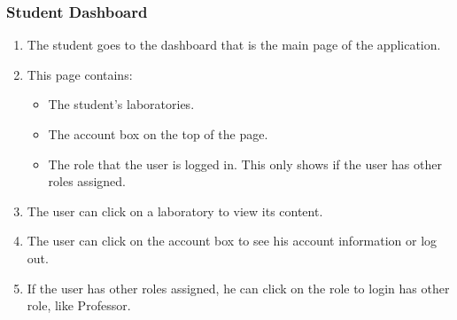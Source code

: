 \subsubsection{Student Dashboard}

\begin{enumerate}
    \item The student goes to the dashboard that is the main page of the application.
    \item This page contains:
    \begin{itemize}
        \item The student's laboratories.
        \item The account box on the top of the page.
        \item The role that the user is logged in. This only shows if the user has other roles assigned.
    \end{itemize}
    \item The user can click on a laboratory to view its content.
    \item The user can click on the account box to see his account information or log out.
    \item If the user has other roles assigned, he can click on the role to login has other role, like Professor.
\end{enumerate}
